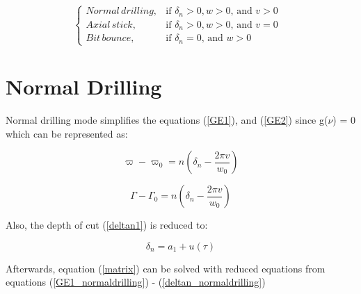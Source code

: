 \begin{equation}\label{drillingmodes}
  \begin{cases}
    Normal\,drilling, & \mbox{if $\delta_n > 0, w > 0$, and $v > 0$ }  \\
    Axial\, stick, & \mbox{if $\delta_n >0, w > 0$, and $v = 0$ } \\
    Bit\,bounce, & \mbox{if $\delta_n = 0$, and $w > 0$}
  \end{cases}
\end{equation}

\section{Normal Drilling}
Normal drilling mode simplifies the equations (\ref{GE1}), and (\ref{GE2}) since g($\nu$) = 0 which can be represented as:

\begin{equation}\label{GE1_normaldrilling}
  \varpi-\varpi_0 = n\left(\delta_n - \frac{2\pi v}{w_0}\right)
\end{equation}

\begin{equation}\label{GE2_normaldrilling}
  \Gamma-\Gamma_0 = n\left(\delta_n - \frac{2\pi v}{w_0}\right)
\end{equation}

Also, the depth of cut (\ref{deltan1}) is reduced to:

\begin{equation}\label{deltan_normaldrilling}
  \delta_n = a_1 + u(\tau)
\end{equation}

Afterwards, equation (\ref{matrix}) can be solved with reduced equations from equations (\ref{GE1_normaldrilling}) - (\ref{deltan_normaldrilling})
